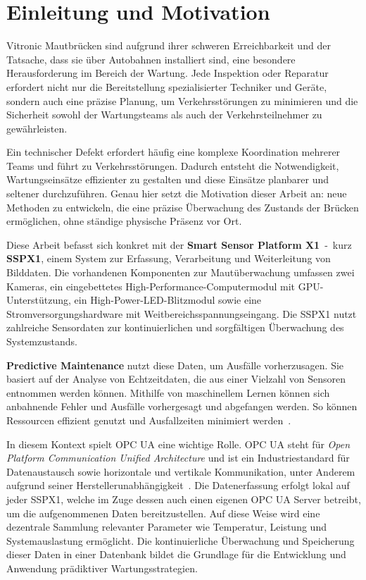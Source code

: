 \chapter{Einleitung und Motivation}
Vitronic Mautbrücken sind aufgrund ihrer schweren Erreichbarkeit und der Tatsache, dass sie über Autobahnen installiert
sind, eine besondere Herausforderung im Bereich der Wartung. Jede Inspektion oder Reparatur erfordert nicht nur die
Bereitstellung spezialisierter Techniker und Geräte, sondern auch eine präzise Planung, um Verkehrsstörungen zu
minimieren und die Sicherheit sowohl der Wartungsteams als auch der Verkehrsteilnehmer zu gewährleisten.

Ein technischer Defekt erfordert häufig eine komplexe Koordination mehrerer Teams und führt zu Verkehrsstörungen. Dadurch
entsteht die Notwendigkeit, Wartungseinsätze effizienter zu gestalten und diese
Einsätze planbarer und seltener durchzuführen. Genau hier setzt die Motivation dieser Arbeit an: neue Methoden zu entwickeln, die
eine präzise Überwachung des Zustands der Brücken ermöglichen, ohne ständige physische Präsenz vor Ort.

Diese Arbeit befasst sich konkret mit der \textbf{Smart Sensor Platform X1}~-~kurz \textbf{SSPX1}, einem System zur
Erfassung, Verarbeitung und Weiterleitung von Bilddaten. Die vorhandenen Komponenten zur Mautüberwachung umfassen zwei Kameras,
ein eingebettetes High-Performance-Computermodul mit GPU-Unterstützung, ein High-Power-LED-Blitzmodul sowie
eine Stromversorgungshardware mit Weitbereichsspannungseingang. Die SSPX1 nutzt zahlreiche Sensordaten zur
kontinuierlichen und sorgfältigen Überwachung des Systemzustands.

\textbf{Predictive Maintenance} nutzt diese Daten, um Ausfälle vorherzusagen. Sie basiert auf der Analyse
von Echtzeitdaten, die aus einer Vielzahl von Sensoren entnommen werden können. Mithilfe von maschinellem Lernen können
sich anbahnende Fehler und Ausfälle vorhergesagt und abgefangen werden. So können Ressourcen effizient
genutzt und Ausfallzeiten minimiert werden~\cite{TobonMejia2012}.

In diesem Kontext spielt OPC UA eine wichtige Rolle. OPC UA steht für \textit{Open Platform Communication
Unified Architecture} und ist ein Industriestandard für Datenaustausch sowie horizontale und vertikale Kommunikation, unter Anderem
aufgrund seiner Herstellerunabhängigkeit~\cite{Babel2024}.
Die Datenerfassung erfolgt lokal auf jeder SSPX1, welche im Zuge dessen auch einen eigenen OPC UA Server betreibt, um die aufgenommenen
Daten bereitzustellen. Auf diese Weise wird eine dezentrale Sammlung relevanter Parameter wie Temperatur,
Leistung und Systemauslastung ermöglicht. Die kontinuierliche Überwachung und Speicherung dieser Daten in einer Datenbank
bildet die Grundlage für die Entwicklung und Anwendung prädiktiver Wartungsstrategien.


